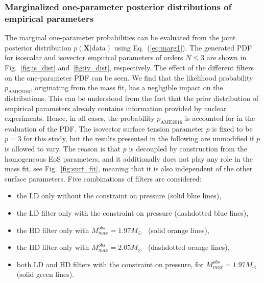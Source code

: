 \subsubsection{Marginalized one-parameter posterior distributions of empirical
parameters}\label{subsubsec:marg}

The marginal one-parameter probabilities can be evaluated from the joint
posterior distribution $p(\bm{X}|\text{data})$ using Eq.~(\ref{eq:marg1}).
The generated PDF for isoscalar and isovector empirical parameters of 
orders $N\leq 3$ are shown in Fig.~\ref{fig:is_dist} and~\ref{fig:iv_dist},
respectively. The effect of the different filters on the one-parameter PDF can
be seen. We find that the likelihood probability $p_{\text{AME2016}}$,
originating from the mass fit, has a negligible impact on the distributions.
This can be understood from the fact that the prior distribution of empirical
parameters already contains information provided by nuclear experiments. Hence, 
in all cases, the probability $p_{\text{AME2016}}$ is accounted for in the
evaluation of the PDF. The isovector surface tension parameter $p$ is fixed to
be $p=3$ for this study, but the results presented in the following are 
unmodified if $p$ is allowed to vary. The reason is that $p$ is decoupled by 
construction from the homogeneous EoS parameters, and it additionally does not 
play any role in the mass fit, see Fig.~\ref{fig:surf_fit}, meaning that it is 
also independent of the other surface parameters. Five combinations of filters 
are considered:
%
\begin{itemize}
  \item the LD only without the constraint on pressure (solid blue
    lines),
  \item the LD filter only with the constraint on pressure (dashdotted blue
    lines),
  \item the HD filter only with $M_{max}^{obs} =
    1.97M_\odot$~\cite{Antoniadis2013} (solid orange lines),
  \item the HD filter only with $M_{max}^{obs} =
    2.05M_\odot$~\cite{Antoniadis2013} (dashdotted orange lines),
  \item both LD and HD filters with the constraint on pressure, for 
    $M_{max}^{obs} = 1.97M_\odot$ (solid green lines).
\end{itemize}
%

